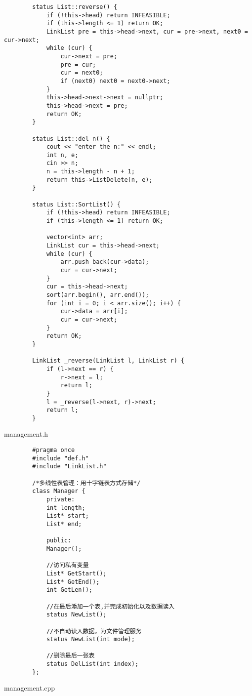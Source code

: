 \documentclass[supercite]{Experimental_Report}
\begin{document}
\begin{lstlisting}
		status List::reverse() {
			if (!this->head) return INFEASIBLE;
			if (this->length <= 1) return OK;
			LinkList pre = this->head->next, cur = pre->next, next0 = cur->next;
			while (cur) {
				cur->next = pre;
				pre = cur;
				cur = next0;
				if (next0) next0 = next0->next;
			}
			this->head->next->next = nullptr;
			this->head->next = pre;
			return OK;
		}
		
		status List::del_n() {
			cout << "enter the n:" << endl;
			int n, e;
			cin >> n;
			n = this->length - n + 1;
			return this->ListDelete(n, e);
		}
		
		status List::SortList() {
			if (!this->head) return INFEASIBLE;
			if (this->length <= 1) return OK;
			
			vector<int> arr;
			LinkList cur = this->head->next;
			while (cur) {
				arr.push_back(cur->data);
				cur = cur->next;
			}
			cur = this->head->next;
			sort(arr.begin(), arr.end());
			for (int i = 0; i < arr.size(); i++) {
				cur->data = arr[i];
				cur = cur->next;
			}
			return OK;
		}
		
		LinkList _reverse(LinkList l, LinkList r) {
			if (l->next == r) {
				r->next = l;
				return l;
			}
			l = _reverse(l->next, r)->next;
			return l;
		}
	\end{lstlisting}
	management.h
	\begin{lstlisting}
		#pragma once
		#include "def.h"
		#include "LinkList.h"
		
		/*多线性表管理：用十字链表方式存储*/
		class Manager {
			private:
			int length;
			List* start;
			List* end;
			
			public:
			Manager();
			
			//访问私有变量
			List* GetStart();
			List* GetEnd();
			int GetLen();
			
			//在最后添加一个表,并完成初始化以及数据读入
			status NewList();
			
			//不自动读入数据，为文件管理服务
			status NewList(int mode);
			
			//删除最后一张表
			status DelList(int index);
		};
	\end{lstlisting}
	management.cpp
\end{document}
